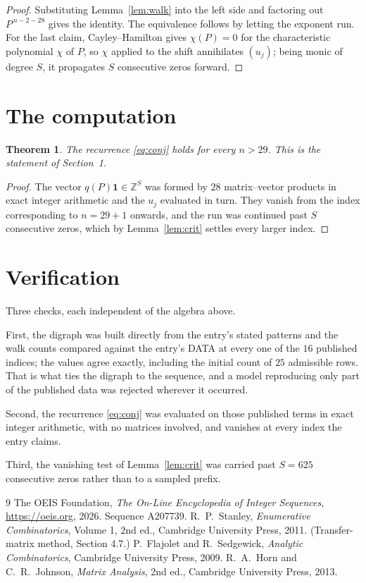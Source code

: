 \documentclass[11pt,a4paper]{article}
\theoremstyle{plain}
\newtheorem{theorem}{Theorem}
\theoremstyle{definition}
\begin{document}
\begin{proof}
Substituting Lemma~\ref{lem:walk} into the left side and factoring out
$P^{\,n-2-28}$ gives the identity. The equivalence follows by letting the exponent
run. For the last claim, Cayley--Hamilton gives $\chi(P)=0$ for the characteristic
polynomial $\chi$ of $P$, so $\chi$ applied to the shift annihilates $(u_j)$; being monic of
degree $S$, it propagates $S$ consecutive zeros forward.
\end{proof}

\section{The computation}

\begin{theorem}
The recurrence \eqref{eq:conj} holds for every $n>29$. This is the statement of
Section~1.
\end{theorem}

\begin{proof}
The vector $q(P)\mathbf{1}\in\mathbb{Z}^{S}$ was formed by $28$ matrix--vector
products in exact integer arithmetic and the $u_j$ evaluated in turn. They vanish from the
index corresponding to $n=29+1$ onwards, and the run was continued past $S$ consecutive
zeros, which by Lemma~\ref{lem:crit} settles every larger index.
\end{proof}

\section{Verification}

Three checks, each independent of the algebra above.

First, the digraph was built directly from the entry's stated patterns and the walk counts
compared against the entry's DATA at every one of the $16$ published indices; the
values agree exactly, including the initial count of $25$ admissible rows. That is
what ties the digraph to the sequence, and a model reproducing only part of the published
data was rejected wherever it occurred.

Second, the recurrence \eqref{eq:conj} was evaluated on those published terms in exact
integer arithmetic, with no matrices involved, and vanishes at every index the entry claims.

Third, the vanishing test of Lemma~\ref{lem:crit} was carried past $S=625$ consecutive
zeros rather than to a sampled prefix.

\begin{thebibliography}{9}
 The OEIS Foundation, \emph{The On-Line Encyclopedia of Integer
Sequences}, \url{https://oeis.org}, 2026. Sequence A207739.
 R.~P.~Stanley, \emph{Enumerative Combinatorics}, Volume 1, 2nd ed.,
Cambridge University Press, 2011. (Transfer-matrix method, Section 4.7.)
 P.~Flajolet and R.~Sedgewick, \emph{Analytic Combinatorics}, Cambridge
University Press, 2009.
 R.~A.~Horn and C.~R.~Johnson, \emph{Matrix Analysis}, 2nd ed., Cambridge
University Press, 2013.
\end{thebibliography}
\end{document}
